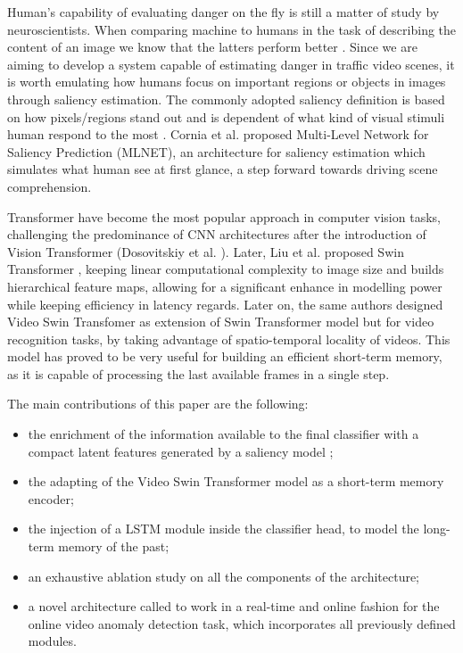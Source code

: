 Human's capability of evaluating danger on the fly is still a matter of study by neuroscientists.
When comparing machine to humans in the task of describing the content of an image we know that the latters perform better \cite{jiang2015salicon}.
Since we are aiming to develop a system capable of estimating danger in traffic video scenes, it is worth emulating how humans focus on important regions or objects in images through saliency estimation.
The commonly adopted saliency definition is based on how pixels/regions stand out and is dependent of what kind of visual stimuli human respond to the most \cite{yan2013hierachical}.
Cornia et al.\cite{cornia2016saliency} proposed Multi-Level Network for Saliency Prediction (MLNET), an architecture for saliency estimation which simulates what human see at first glance, a step forward towards driving scene comprehension.

Transformer have become the most popular approach in computer vision tasks, challenging the predominance of CNN architectures after the introduction of Vision Transformer (Dosovitskiy et al. \cite{DBLP:conf/iclr/DosovitskiyB0WZ21}).
Later, Liu et al. proposed Swin Transformer \cite{liu2021Swin}, keeping linear computational complexity to image size and builds hierarchical feature maps, allowing for a significant enhance in modelling power while keeping efficiency in latency regards.
Later on, the same authors designed Video Swin Transfomer \cite{liu_video_2022} as extension of Swin Transformer model but for video recognition tasks, by taking advantage of spatio-temporal locality of videos.
This model has proved to be very useful for building an efficient short-term memory, as it is capable of processing the last available frames in a single step.


The main contributions of this paper are the following:
\begin{itemize}
    \item the enrichment of the information available to the final classifier with a compact latent features generated by a saliency model \cite{cornia2016deep};
    \item the adapting of the Video Swin Transformer model \cite{liu_video_2022} as a short-term memory encoder;
    \item the injection of a LSTM module inside the classifier head, to model the long-term memory of the past;
    \item an exhaustive ablation study on all the components of the architecture;
    \item a novel architecture called  to work in a real-time and online fashion for the online video anomaly detection task, which incorporates all previously defined modules.
\end{itemize}


